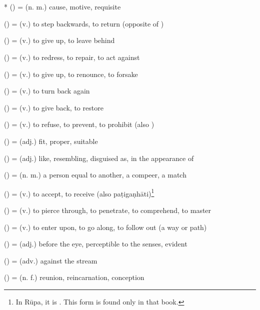 \section*{}\label{upasagga:pati}
\begin{compactitem}
\item {}* () = (n. m.) cause, motive, requisite
\item {} () = (v.) to step backwards, to return (opposite of )
\item {} () = (v.) to give up, to leave behind
\item {} () = (v.) to redress, to repair, to act against
\item {} () = (v.) to give up, to renounce, to forsake
\item {} () = (v.) to turn back again
\item {} () = (v.) to give back, to restore
\item {} () = (v.) to refuse, to prevent, to prohibit (also )
\item {} () = (adj.) fit, proper, suitable
\item {} () = (adj.) like, resembling, disguised as, in the appearance of
\item {} () = (n. m.) a person equal to another, a compeer, a match
\item {} () = (v.) to accept, to receive (also pa\d tiga\d nh\=ati)\footnote{In R\=upa, it is . This form is found only in that book.}
\item {} () = (v.) to pierce through, to penetrate, to comprehend, to master
\item {} () = (v.) to enter upon, to go along, to follow out (a way or path)
\item {} () = (adj.) before the eye, perceptible to the senses, evident
\item {} () = (adv.) against the stream
\item {} () = (n. f.) reunion, reincarnation, conception
\end{compactitem}

